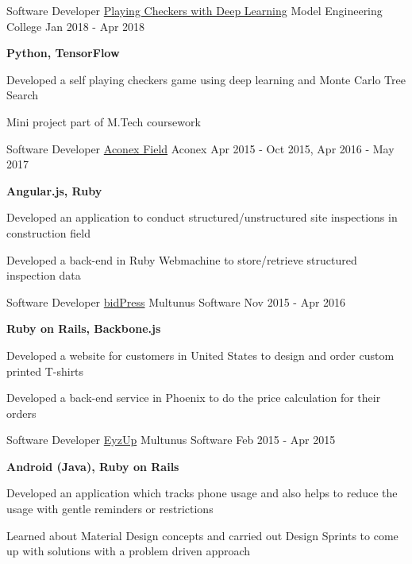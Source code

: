 \begin{cventries} 
  \cventry
    {Software Developer}
    {\href{}{Playing Checkers with Deep Learning}}
    {Model Engineering College}
    {Jan 2018 - Apr 2018}
    {
      \begin{cvitems}
        \item {\textbf{Python, TensorFlow}}
        \item {Developed a self playing checkers game using deep learning and Monte Carlo Tree Search}
        \item {Mini project part of M.Tech coursework}
      \end{cvitems}
    }
  \cventry
    {Software Developer}
    {\href{https://www.aconex.com/support/aconex-field}{Aconex Field}}
    {Aconex}
    {Apr 2015 - Oct 2015, Apr 2016 - May 2017}
    {
      \begin{cvitems}
        \item {\textbf{Angular.js, Ruby}}
        \item {Developed an application to conduct structured/unstructured site inspections in construction field}
        \item {Developed a back-end in Ruby Webmachine to store/retrieve structured inspection data}
      \end{cvitems}
    }
  \cventry
    {Software Developer}
    {\href{https://www.bidpress.com/}{bidPress}}
    {Multunus Software}
    {Nov 2015 - Apr 2016}
    {
      \begin{cvitems}
        \item {\textbf{Ruby on Rails, Backbone.js}}
        \item {Developed a website for customers in United States to design and order custom printed T-shirts}
        \item {Developed a back-end service in Phoenix to do the price calculation for their orders}
      \end{cvitems}
    }
  \cventry
    {Software Developer}
    {\href{https://play.google.com/store/apps/details?id=com.eyz_up.android}{EyzUp}}
    {Multunus Software}
    {Feb 2015 - Apr 2015}
    {
      \begin{cvitems}
        \item {\textbf{Android (Java), Ruby on Rails}}
        \item {Developed an application which tracks phone usage and also helps to reduce the usage with gentle reminders or restrictions}
        \item {Learned about Material Design concepts and carried out Design Sprints to come up with solutions with a problem driven approach}

\end{cvitems}}
\end{cventries}
